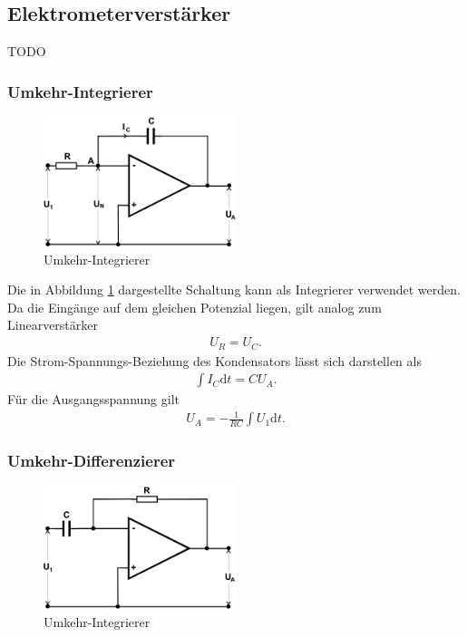 \subsection{Elektrometerverstärker}
TODO

\subsubsection{Umkehr-Integrierer}

\begin{figure}
	\centering
	\includegraphics[width=0.5\textwidth]{img/int.png}
	\caption{Umkehr-Integrierer \cite{v51}}
	\label{fig:int}
\end{figure}

Die in Abbildung \ref{fig:int} dargestellte Schaltung kann als Integrierer verwendet werden.
Da die Eingänge auf dem gleichen Potenzial liegen, gilt analog zum Linearverstärker
\begin{align}
	U_R = U_C.
\end{align}
Die Strom-Spannungs-Beziehung des Kondensators lässt sich darstellen als
\begin{align}
	\int I_C \text{d}t = C U_A.
\end{align}
Für die Ausgangsspannung gilt
\begin{align}
	U_A = -\frac{1}{RC} \int U_1 \text{d}t.
\end{align}


\subsubsection{Umkehr-Differenzierer}

\begin{figure}
	\centering
	\includegraphics[width=0.5\textwidth]{img/diff.png}
	\caption{Umkehr-Integrierer \cite{v51}}
	\label{fig:diff}
\end{figure}

